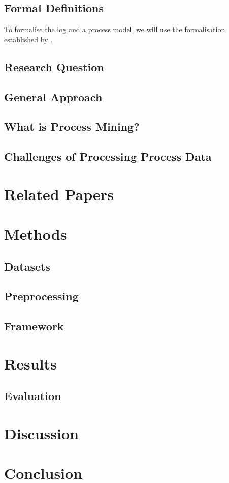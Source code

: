 \documentclass[12pt,a4paper]{report}
\begin{document}
\section{Formal Definitions}
To formalise  the log and a process model, we will use the formalisation established by \citeauthor{???}\needscite.

\section{Research Question}

\section{General Approach}

\section{What is Process Mining?}

\section{Challenges of Processing Process Data}

\chapter{Related Papers}


\chapter{Methods}
\label{sec:methods}

\section{Datasets}
\label{sec:datasets}

\section{Preprocessing}
\label{sec:preprocessing}

\section{Framework}

\chapter{Results}
\label{sec:results}

\section{Evaluation}
\label{subsec:evaluation}


\chapter{Discussion}
\label{sec:dicussion}


\chapter{Conclusion}
\label{sec:conclusion}


\printbibliography

\appendix
\end{document}
